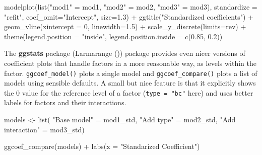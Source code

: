 \documentclass[
  letterpaper,
  10pt,
  krantz2]{krantz}
\makeatletter
\newenvironment{Shaded}{\begin{snugshade}}{\end{snugshade}}
\newcommand{\AttributeTok}[1]{\textcolor[rgb]{0.40,0.45,0.13}{#1}}
\newcommand{\DecValTok}[1]{\textcolor[rgb]{0.68,0.00,0.00}{#1}}
\newcommand{\FloatTok}[1]{\textcolor[rgb]{0.68,0.00,0.00}{#1}}
\newcommand{\FunctionTok}[1]{\textcolor[rgb]{0.28,0.35,0.67}{#1}}
\newcommand{\NormalTok}[1]{\textcolor[rgb]{0.00,0.23,0.31}{#1}}
\newcommand{\OtherTok}[1]{\textcolor[rgb]{0.00,0.23,0.31}{#1}}
\newcommand{\SpecialCharTok}[1]{\textcolor[rgb]{0.37,0.37,0.37}{#1}}
\newcommand{\StringTok}[1]{\textcolor[rgb]{0.13,0.47,0.30}{#1}}
\newenvironment{kframe}{%
  \medskip{}
  \setlength{\fboxsep}{.8em}
  \def\at@end@of@kframe{}%
  \ifinner\ifhmode%
  \def\at@end@of@kframe{\end{minipage}}%
  \begin{minipage}{\columnwidth}%
  \fi\fi%
  \def\FrameCommand##1{\hskip\@totalleftmargin \hskip-\fboxsep
  \colorbox{shadecolor}{##1}\hskip-\fboxsep
      \hskip-\linewidth \hskip-\@totalleftmargin \hskip\columnwidth}%
  \MakeFramed {\advance\hsize-\width
    \@totalleftmargin\z@ \linewidth\hsize
    \@setminipage}}%
{\par\unskip\endMakeFramed%
  \at@end@of@kframe}
\renewenvironment{Shaded}{\begin{kframe}}{\end{kframe}}
\makeatother
\begin{document}
\begin{Shaded}
\begin{Highlighting}[]
\FunctionTok{modelplot}\NormalTok{(}\FunctionTok{list}\NormalTok{(}\StringTok{"mod1"} \OtherTok{=}\NormalTok{ mod1, }\StringTok{"mod2"} \OtherTok{=}\NormalTok{ mod2, }\StringTok{"mod3"} \OtherTok{=}\NormalTok{ mod3),}
          \AttributeTok{standardize =} \StringTok{"refit"}\NormalTok{,}
          \AttributeTok{coef\_omit=}\StringTok{"Intercept"}\NormalTok{, }\AttributeTok{size=}\FloatTok{1.3}\NormalTok{) }\SpecialCharTok{+}
  \FunctionTok{ggtitle}\NormalTok{(}\StringTok{"Standardized coefficients"}\NormalTok{) }\SpecialCharTok{+}
  \FunctionTok{geom\_vline}\NormalTok{(}\AttributeTok{xintercept =} \DecValTok{0}\NormalTok{, }\AttributeTok{linewidth=}\FloatTok{1.5}\NormalTok{) }\SpecialCharTok{+}
  \FunctionTok{scale\_y\_discrete}\NormalTok{(}\AttributeTok{limits=}\NormalTok{rev) }\SpecialCharTok{+}
  \FunctionTok{theme}\NormalTok{(}\AttributeTok{legend.position =} \StringTok{"inside"}\NormalTok{,}
        \AttributeTok{legend.position.inside =} \FunctionTok{c}\NormalTok{(}\FloatTok{0.85}\NormalTok{, }\FloatTok{0.2}\NormalTok{))}
\end{Highlighting}
\end{Shaded}

The \textbf{ggstats} package (Larmarange
()) package provides even nicer versions
of coefficient plots that handle factors in a more reasonable way, as
levels within the factor. \texttt{ggcoef\_model()} plots a single model
and \texttt{ggcoef\_compare()} plots a list of models using sensible
defaults. A small but nice feature is that it explicitly shows the 0
value for the reference level of a factor (\texttt{type\ =\ "bc"} here)
and uses better labels for factors and their interactions.

\begin{Shaded}
\begin{Highlighting}[]
\NormalTok{models }\OtherTok{\textless{}{-}} \FunctionTok{list}\NormalTok{(}
  \StringTok{"Base model"}      \OtherTok{=}\NormalTok{ mod1\_std,}
  \StringTok{"Add type"}        \OtherTok{=}\NormalTok{ mod2\_std,}
  \StringTok{"Add interaction"} \OtherTok{=}\NormalTok{ mod3\_std)}

\FunctionTok{ggcoef\_compare}\NormalTok{(models) }\SpecialCharTok{+}
  \FunctionTok{labs}\NormalTok{(}\AttributeTok{x =} \StringTok{"Standarized Coefficient"}\NormalTok{)}
\end{Highlighting}
\end{Shaded}
\end{document}
